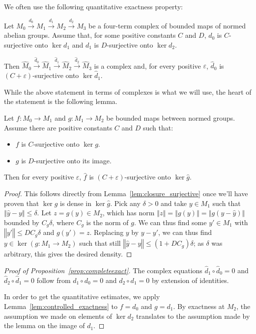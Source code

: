 We often use the following quantitative exactness property:

\begin{proposition}\label{prop:completeexact}
Let $M_0\xrightarrow{d_0} M_1\xrightarrow{d_1} M_2\xrightarrow{d_2} M_3$ be a
four-term complex of bounded maps of normed abelian groups. Assume that, for
some positive constants $C$ and $D$, $d_0$ is $C$-surjective onto $\ker d_1$
and $d_1$ is $D$-surjective onto $\ker d_2$.

Then
$\widehat{M}_0\xrightarrow{\widehat{d}_0} \widehat{M}_1\xrightarrow{\widehat{d}_1} \widehat{M}_2\xrightarrow{\widehat{d}_2} \widehat{M}_3$
is a complex and, for every positive $ε$, $\widehat{d}_0$ is $(C + ε)$-surjective
onto $\ker \widehat{d}_1$.
\end{proposition}

While the above statement in terms of complexes is what we will use,
the heart of the statement is the following lemma.

\begin{lemma}\label{lem:controlled_exactness}
  \leanok
  Let $f : M_0 → M_1$ and $g : M_1 → M_2$ be bounded maps between normed groups.
  Assume there are positive constants $C$ and $D$ such that:
  \begin{itemize}
    \item
      $f$ is $C$-surjective onto $\ker g$.
    \item
      $g$ is $D$-surjective onto its image.
  \end{itemize}
  Then for every positive $ε$, $\widehat{f}$ is $(C + ε)$-surjective onto
  $\ker \widehat{g}$.
\end{lemma}

\begin{proof}\leanok
  This follows directly from Lemma~\ref{lem:closure_surjective} once
  we'll have proven that $\ker g$ is dense in $\ker \widehat{g}$.
  Pick any $\delta > 0$ and take $y\in M_1$ such that
  $‖\widehat{y}-y‖\leq \delta$. Let $z=g(y)\in M_2$, which has norm
  $‖z‖=‖g(y)‖=‖g(y-\widehat{y})‖$ bounded by
  $C_{g}\delta$, where $C_{g}$ is the norm of $g$. We can thus find some
  $y'\in M_1$ with $‖y'‖\leq DC_{g}\delta$ and $g(y')=z$. Replacing $y$ by
  $y-y'$, we can thus find $y\in \ker(g: M_1\to M_2)$ such that still
  $‖\widehat{y}-y‖\leq (1+DC_{g})\delta$; as $\delta$ was arbitrary, this
  gives the desired density.
\end{proof}

\begin{proof}[Proof of Proposition~\ref{prop:completeexact}]
  The complex equations $\widehat d_1 ∘ \widehat d_0 = 0$ and
  $\widehat d_2 ∘ \widehat d_1 = 0$ follow from $d_1 ∘ d_0 = 0$ and
  $d_2 ∘ d_1 = 0$ by extension of identities.

  In order to get the quantitative estimates, we apply
  Lemma~\ref{lem:controlled_exactness} to $f = d_0$ and $g = d_1$. By exactness
  at $M_2$, the assumption we made on elements of $\ker d_2$ translates to the
  assumption made by the lemma on the image of $d_1$.
\end{proof}

